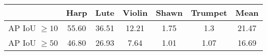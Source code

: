\begin{tabular}{c|c|c|c|c|c||c}\hline
		& Harp & Lute & Violin & Shawn & Trumpet & Mean\\ \hline \hline 
	AP IoU $\geq10$ & 55.60         & 36.51      & 12.21           & 1.75 & 1.3   &  21.47  \\
	AP IoU $\geq50$ & 46.80         &  26.93    &  7.64          &  1.01       & 1.07 & 16.69 
\end{tabular}

